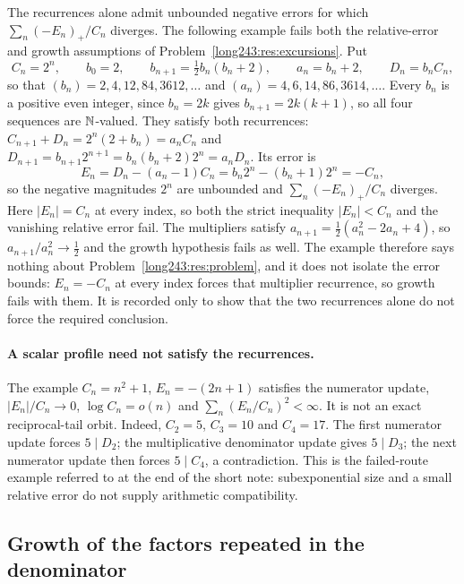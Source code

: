 \documentclass[11pt]{article}
\begin{document}
\begin{remark}\label{long243:rem:recurrence-without-relative-bound}
The recurrences alone admit unbounded negative errors for which
$\sum_n(-E_n)_+/C_n$ diverges. The following example fails both the
relative-error and growth assumptions of Problem~\ref{long243:res:excursions}. Put
\[
 C_n=2^{n},\qquad b_0=2,\qquad b_{n+1}=\tfrac12 b_n(b_n+2),\qquad
 a_n=b_n+2,\qquad D_n=b_nC_n ,
\]
so that $(b_n)=2,4,12,84,3612,\ldots$ and $(a_n)=4,6,14,86,3614,\ldots$.  Every
$b_n$ is a positive even integer, since $b_n=2k$ gives $b_{n+1}=2k(k+1)$, so all
four sequences are $\mathbb{N}$-valued. They satisfy both recurrences:
$C_{n+1}+D_n=2^{n}(2+b_n)=a_nC_n$ and
$D_{n+1}=b_{n+1}2^{n+1}=b_n(b_n+2)2^{n}=a_nD_n$.  Its error is
\[
 E_n=D_n-(a_n-1)C_n=b_n2^{n}-(b_n+1)2^{n}=-C_n ,
\]
so the negative magnitudes $2^{n}$ are unbounded and $\sum_n(-E_n)_+/C_n$
diverges. Here $|E_n|=C_n$ at every index, so both the strict inequality
$|E_n|<C_n$ and the vanishing relative error fail. The
multipliers satisfy $a_{n+1}=\tfrac12(a_n^{2}-2a_n+4)$, so
$a_{n+1}/a_n^{2}\to\tfrac12$ and the growth hypothesis fails as well.  The
example therefore says nothing about Problem~\ref{long243:res:problem}, and it does not
isolate the error bounds: $E_n=-C_n$ at every index forces that
multiplier recurrence, so growth fails with them.  It is recorded only to show
that the two recurrences alone do not force the required conclusion.
\end{remark}

\paragraph{A scalar profile need not satisfy the recurrences.}
The example $C_n=n^2+1$, $E_n=-(2n+1)$ satisfies the numerator update,
$|E_n|/C_n\to0$, $\log C_n=o(n)$ and $\sum_n(E_n/C_n)^2<\infty$.
It is not an exact reciprocal-tail orbit. Indeed, $C_2=5$, $C_3=10$
and $C_4=17$. The first numerator update forces $5\mid D_2$; the
multiplicative denominator update gives $5\mid D_3$; the next numerator
update then forces $5\mid C_4$, a contradiction. This is the failed-route
example referred to at the end of the short note: subexponential size
and a small relative error do not supply arithmetic compatibility.

\subsection{Growth of the factors repeated in the denominator}
\end{document}
